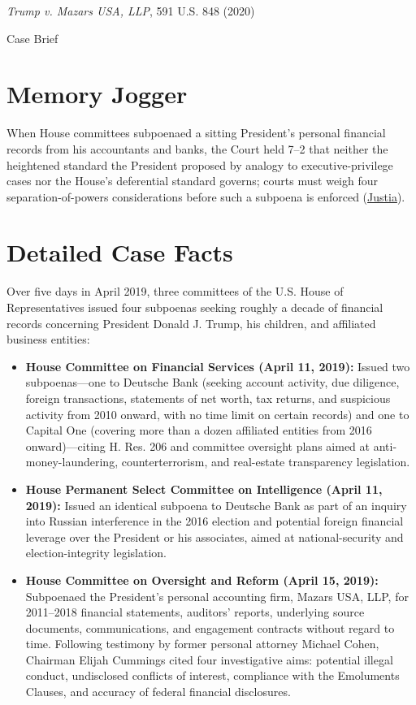 \documentclass[12pt]{article}
\begin{document}
\begin{center}
{\LARGE \textit{Trump v. Mazars USA, LLP}, 591 U.S. 848 (2020)\par}
\vspace{0.8em}
{\large Case Brief\par}
\end{center}
\vspace{1em}

\section{Memory Jogger}
When House committees subpoenaed a sitting President's personal financial records from his accountants and banks, the Court held 7--2 that neither the heightened standard the President proposed by analogy to executive-privilege cases nor the House's deferential standard governs; courts must weigh four separation-of-powers considerations before such a subpoena is enforced (\href{https://supreme.justia.com/cases/federal/us/591/19-715/}{Justia}).

\section{Detailed Case Facts}
Over five days in April 2019, three committees of the U.S. House of Representatives issued four subpoenas seeking roughly a decade of financial records concerning President Donald J. Trump, his children, and affiliated business entities:
\begin{itemize}
  \item \textbf{House Committee on Financial Services (April 11, 2019):} Issued two subpoenas---one to Deutsche Bank (seeking account activity, due diligence, foreign transactions, statements of net worth, tax returns, and suspicious activity from 2010 onward, with no time limit on certain records) and one to Capital One (covering more than a dozen affiliated entities from 2016 onward)---citing H. Res. 206 and committee oversight plans aimed at anti-money-laundering, counterterrorism, and real-estate transparency legislation.
  \item \textbf{House Permanent Select Committee on Intelligence (April 11, 2019):} Issued an identical subpoena to Deutsche Bank as part of an inquiry into Russian interference in the 2016 election and potential foreign financial leverage over the President or his associates, aimed at national-security and election-integrity legislation.
  \item \textbf{House Committee on Oversight and Reform (April 15, 2019):} Subpoenaed the President's personal accounting firm, Mazars USA, LLP, for 2011--2018 financial statements, auditors' reports, underlying source documents, communications, and engagement contracts without regard to time. Following testimony by former personal attorney Michael Cohen, Chairman Elijah Cummings cited four investigative aims: potential illegal conduct, undisclosed conflicts of interest, compliance with the Emoluments Clauses, and accuracy of federal financial disclosures.
\end{itemize}
\end{document}
